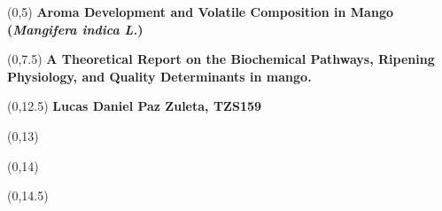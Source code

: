 \begin{titlepage}

    
    \begin{textblock}{9.4}(0,5)
        \Huge{\selectfont\bfseries{Aroma Development and Volatile Composition in Mango (\textit{Mangifera indica L.}) }}
    \end{textblock}
    
    \begin{textblock}{9.4}(0,7.5)
        \LARGE{\selectfont\bfseries{A Theoretical Report on the Biochemical Pathways, Ripening Physiology, and Quality Determinants in mango.}}
    \end{textblock}
    

    \begin{textblock}{9.4}(0,12.5)
        \large{\selectfont\bfseries{
        Lucas Daniel Paz Zuleta, TZS159}}
    \end{textblock}
    
    \begin{textblock}{9.4}(0,13)
        \large{\selectfont{MSc students at the University of Copenhagen}}
    \end{textblock}
    

    \begin{textblock}{9.4}(0,14)
        \large{\selectfont{Last compiled: \today}}
    \end{textblock}
    
    \begin{textblock}{8.4}(0,14.5)
        \large{}
    \end{textblock}
    

\end{titlepage}
